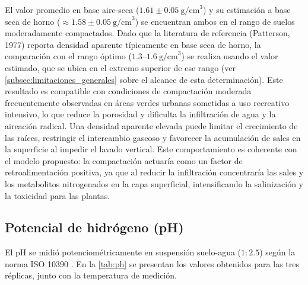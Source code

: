 \documentclass[fleqn]{jaes}
\begin{document}
El valor promedio en base aire-seca ($1.61 \pm 0.05~\text{g/cm}^3$) y su estimación a base seca de horno ($\approx 1.58 \pm 0.05~\text{g/cm}^3$) se encuentran ambos en el rango de suelos moderadamente compactados. Dado que la literatura de referencia (Patterson, 1977) reporta densidad aparente típicamente en base seca de horno, la comparación con el rango óptimo ($1.3$--$1.6~\text{g/cm}^3$) se realiza usando el valor estimado, que se ubica en el extremo superior de ese rango (ver \cref{subsec:limitaciones_generales} sobre el alcance de esta determinación). Este resultado es compatible con condiciones de compactación moderada frecuentemente observadas en áreas verdes urbanas sometidas a uso recreativo intensivo, lo que reduce la porosidad y dificulta la infiltración de agua y la aireación radical. Una densidad aparente elevada puede limitar el crecimiento de las raíces, restringir el intercambio gaseoso y favorecer la acumulación de sales en la superficie al impedir el lavado vertical. Este comportamiento es coherente con el modelo propuesto: la compactación actuaría como un factor de retroalimentación positiva, ya que al reducir la infiltración concentraría las sales y los metabolitos nitrogenados en la capa superficial, intensificando la salinización y la toxicidad para las plantas.

\subsection{Potencial de hidrógeno (pH)}

El pH se midió potenciométricamente en suspensión suelo-agua ($1:2.5$) según la norma ISO 10390 \cite{InternationalOrganizationforStandardization2021}. En la \cref{tab:ph} se presentan los valores obtenidos para las tres réplicas, junto con la temperatura de medición.
\end{document}
